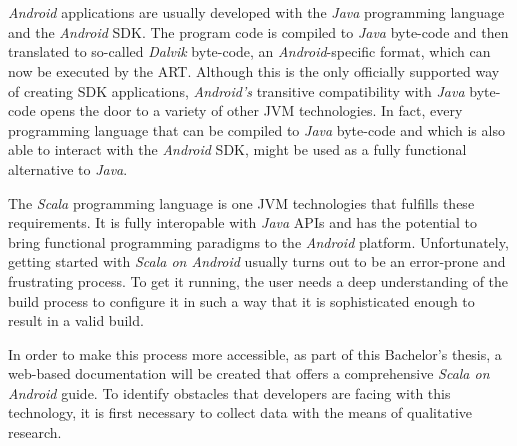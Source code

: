 \section*{}

\textit{Android} applications are usually developed with the \textit{Java} programming language and the \textit{Android} \ac{SDK}. The program code is compiled to \textit{Java} byte-code and then translated to so-called \textit{Dalvik} byte-code, an \textit{Android}-specific format, which can now be executed by the \ac{ART}. Although this is the only officially supported way of creating \ac{SDK} applications, \textit{Android's} transitive compatibility with \textit{Java} byte-code opens the door to a variety of other \ac{JVM} technologies. In fact, every programming language that can be compiled to \textit{Java} byte-code and which is also able to interact with the \textit{Android} \ac{SDK}, might be used as a fully functional alternative to \textit{Java}.

The \textit{Scala} programming language is one \ac{JVM} technologies that fulfills these requirements. It is fully interopable with \textit{Java} \acp{API} and has the potential to bring functional programming paradigms to the \textit{Android} platform. Unfortunately, getting started with \textit{Scala on Android} usually turns out to be an error-prone and frustrating process. To get it running, the user needs a deep understanding of the build process to configure it in such a way that it is sophisticated enough to result in a valid build.

In order to make this process more accessible, as part of this Bachelor's thesis, a web-based documentation will be created that offers a comprehensive \textit{Scala on Android} guide. To identify obstacles that developers are facing with this technology, it is first necessary to collect data with the means of qualitative research.